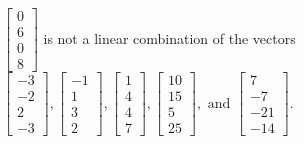\begin{exercise}
\begin{exerciseStatement}
  \end{exerciseStatement}
  \begin{exerciseAnswer}
   \(\left[\begin{array}{c}
0 \\
6 \\
0 \\
8
\end{array}\right]\) 
  	 is not  
	a linear combination of the vectors \(\left[\begin{array}{c}
-3 \\
-2 \\
2 \\
-3
\end{array}\right] , \left[\begin{array}{c}
-1 \\
1 \\
3 \\
2
\end{array}\right] , \left[\begin{array}{c}
1 \\
4 \\
4 \\
7
\end{array}\right] , \left[\begin{array}{c}
10 \\
15 \\
5 \\
25
\end{array}\right] , \text{ and } \left[\begin{array}{c}
7 \\
-7 \\
-21 \\
-14
\end{array}\right]\).

	
  


  \end{exerciseAnswer}
\end{exercise}